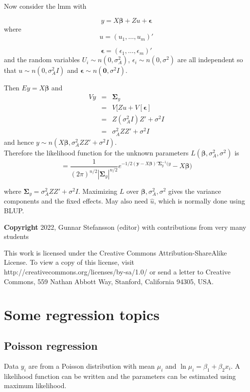 \documentclass[12pt,a4paper]{article}
\theoremstyle{regla}
\theoremstyle{remark}
\theoremstyle{definition}
\theoremstyle{nonumberbreak}
\begin{document}
Now consider the lmm with 

$$y = X \boldsymbol{\beta} + Zu + \boldsymbol{\epsilon}$$
where
 $$u = (u_1 , \ldots , u_m)' $$

 
 $$\boldsymbol{\epsilon} = (\epsilon_1 , \ldots , \epsilon_m)'$$
and the random variables  $U_i \sim n(0, \sigma^2_A)$, $\epsilon_i \sim n(0, \sigma^2)$ are all independent so that $u \sim n(0, \sigma^2_A I)$ and $\boldsymbol{\epsilon} \sim n(\mathbf{0}, \sigma^2 I)$.

Then $Ey = X\boldsymbol{\beta}$ and 
\begin{eqnarray*}
Vy& = & \boldsymbol{\Sigma}_y \\
& = & V[Zu+V[\boldsymbol{\epsilon}] \\
& = & Z(\sigma^2_A I) Z' + \sigma^2 I\\
& = & \sigma^2_A Z Z' + \sigma^2 I
\end{eqnarray*}
and hence $y \sim n(X\boldsymbol{\beta},\sigma^2_A Z Z' + \sigma^2 I )$.\\

Therefore the likelihood function for the unknown parameters $L(\boldsymbol{\beta},\sigma^2_A, \sigma^2)$ is
$$ = \frac{1}{(2\pi)^{n/2} \left| \boldsymbol{\Sigma}_y \right| ^{n/2}} e^{-1/2 (\mathbf{y}-X\boldsymbol{\beta})' \boldsymbol{\Sigma}^{-1}_y (y}-X\boldsymbol{\beta})$$

where $\boldsymbol{\Sigma}_y =  \sigma^2_A Z Z' + \sigma^2 I$. Maximizing $L$ over $\boldsymbol{\beta},\sigma^2_A, \sigma^2$ gives the variance components and the fixed effects. May also need $\hat{u}$, which is normally done using BLUP.


{\bf Copyright}
2022, Gunnar Stefansson (editor) with contributions from very many students

This work is licensed under the Creative Commons
Attribution-ShareAlike License. To view a copy of this license, visit
http://creativecommons.org/licenses/by-sa/1.0/ or send a letter to
Creative Commons, 559 Nathan Abbott Way, Stanford, California 94305,
USA.
\clearpage
\section{Some regression topics}
\subsection{Poisson regression}
\begin{fbox}
\begin{minipage}{0.97\textwidth}
Data $y_i$ are from a Poisson distribution with mean $\mu_i$ and $\ln{\mu_i}=\beta_1+\beta_2 x_i$. A likelihood function can be written and the parameters can be estimated using maximum likelihood.



\end{minipage}
\end{fbox}
\end{document}
